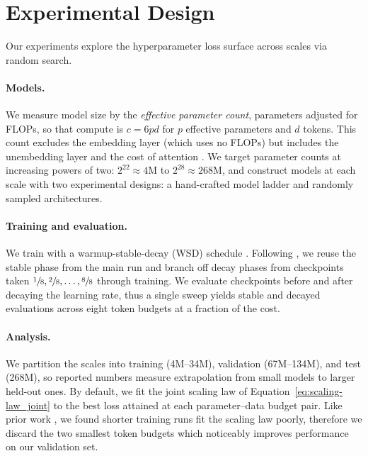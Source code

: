 \section{Experimental Design}
\label{app:experimental-design}

Our experiments explore the hyperparameter loss surface across scales via random search.

\paragraph{Models.} We measure model size by the \textit{effective parameter count}, parameters adjusted for FLOPs, so that compute is $c = 6pd$ for $p$ effective parameters and $d$ tokens. This count excludes the embedding layer (which uses no FLOPs) but includes the unembedding layer and the cost of attention \citep[\S B]{Porian2024Resolving}. We target parameter counts at increasing powers of two: $2^{22}\approx4\text{M}$ to $2^{28}\approx268\text{M}$, and construct models at each scale with two experimental designs: a hand-crafted model ladder and randomly sampled architectures.

\paragraph{Training and evaluation.} We train with a warmup-stable-decay (WSD) schedule \citep{hu2024minicpm}. Following \citet{Hagele2024ScalingLaws}, we reuse the stable phase from the main run and branch off decay phases from checkpoints taken $\sfrac{1}{8}, \sfrac{2}{8}, \ldots, \sfrac{8}{8}$ through training. We evaluate checkpoints before and after decaying the learning rate, thus a single sweep yields stable and decayed evaluations across eight token budgets at a fraction of the cost.

\paragraph{Analysis.} We partition the scales into training (4M--34M), validation (67M--134M), and test (268M), so reported numbers measure extrapolation from small models to larger held-out ones. By default, we fit the joint scaling law of Equation~\ref{eq:scaling-law_joint} to the best loss attained at each parameter--data budget pair. Like prior work \citep{hilton2023scalinglawssingleagentreinforcement, li2025misfitting}, we found shorter training runs fit the scaling law poorly, therefore we discard the two smallest token budgets which noticeably improves performance on our validation set.


